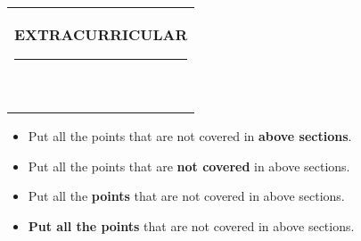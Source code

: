 \documentclass[10pt,A4]{article}
\newcommand{\mpwidth}{\linewidth-\fboxsep-\fboxsep}
\newcommand{\cvtext}[1] {
	\begin{tabular*}{1\mpwidth}{p{0.98\mpwidth}}
		\parbox{1\mpwidth}{#1}
	\end{tabular*}
}
\newcommand{\cvsection}[1] {
	\vspace{14pt}
	\cvtext{
		\textbf{\LARGE{\textcolor{darkcol}{\uppercase{#1}}}}\\[-4pt]
		\textcolor{maincol}{ \rule{0.1\textwidth}{2pt} } \\
	}
}
\begin{document}
\begin{paracol}{2}
\begin{rightcolumn}
\vfill\null
\cvsection{EXTRACURRICULAR}
\vspace{-0.3cm}
\begin{itemize}
  \item Put all the points that are not covered in \textbf{above sections}.
  \item Put all the points that are \textbf{not covered} in above sections.
  \item Put all the \textbf{points} that are not covered in above sections.
  \item \textbf{Put all the points} that are not covered in above sections.
\end{itemize}
\vfill\null


\vfill
\vfill
\vfill
\end{rightcolumn}
\end{paracol}
\end{document}
